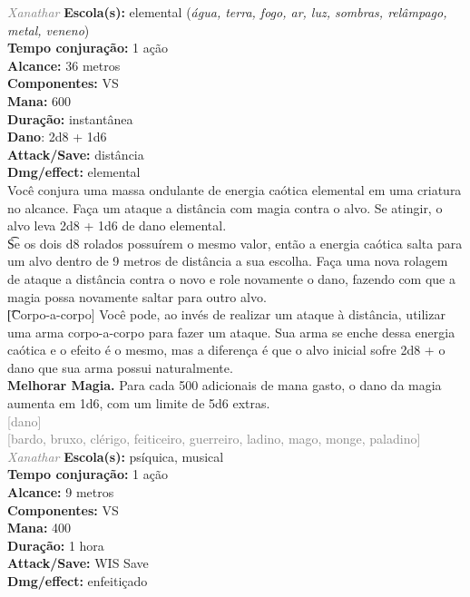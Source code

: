 \documentclass{RPG_Adventure}[2021/10/20]
\begin{document}
{\tiny \textcolor{gray}{\textit{Xanathar}}}
{\small \t \textbf{Escola(s):} elemental (\textit{água, terra, fogo, ar, luz, sombras, relâmpago, metal, veneno})\\\t \textbf{Tempo conjuração:} 1 ação\\\t \textbf{Alcance:} 36 metros\\\t \textbf{Componentes:} VS\\\t \textbf{Mana:} 600\\\t \textbf{Duração:} instantânea\\\t \textbf{Dano}: 2d8 + 1d6\\\t \textbf{Attack/Save:} distância\\\t \textbf{Dmg/effect:} elemental\\}
{\normalsize Você conjura uma massa ondulante de energia caótica elemental em uma criatura no alcance. Faça um ataque a distância com magia contra o alvo. Se atingir, o alvo leva 2d8 + 1d6 de dano elemental.\\\t Se os dois d8 rolados possuírem o mesmo valor, então a energia caótica salta para um alvo dentro de 9 metros de distância a sua escolha. Faça uma nova rolagem de ataque a distância contra o novo e role novamente o dano, fazendo com que a magia possa novamente saltar para outro alvo.\\\t [Corpo-a-corpo] Você pode, ao invés de realizar um ataque à distância, utilizar uma arma corpo-a-corpo para fazer um ataque. Sua arma se enche dessa energia caótica e o efeito é o mesmo, mas a diferença é que o alvo inicial sofre 2d8 + o dano que sua arma possui naturalmente.\\\t \textbf{Melhorar Magia.} Para cada 500 adicionais de mana gasto, o dano da magia aumenta em 1d6, com um limite de 5d6 extras.\\}
{\scriptsize \textcolor{gray}{[dano]\\}}
{\scriptsize \textcolor{gray}{[bardo, bruxo, clérigo, feiticeiro, guerreiro, ladino, mago, monge, paladino]\\}}
{\tiny \textcolor{gray}{\textit{Xanathar}}}
{\small \t \textbf{Escola(s):} psíquica, musical\\\t \textbf{Tempo conjuração:} 1 ação\\\t \textbf{Alcance:} 9 metros\\\t \textbf{Componentes:} VS\\\t \textbf{Mana:} 400\\\t \textbf{Duração:} 1 hora\\\t \textbf{Attack/Save:} WIS Save\\\t \textbf{Dmg/effect:} enfeitiçado\\}
\end{document}
